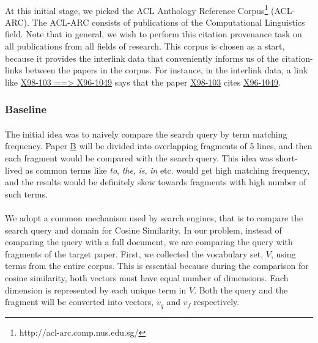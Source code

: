\documentclass[12 pt]{article}
\begin{document}
\paragraph{}
At this initial stage, we picked the ACL Anthology Reference Corpus\footnote{http://acl-arc.comp.nus.edu.sg/} (ACL-ARC). The ACL-ARC consists of publications of the Computational Linguistics field. Note that in general, we wish to perform this citation provenance task on all publications from all fields of research. This corpus is chosen as a start, because it provides the interlink data that conveniently informs us of the citation-links between the papers in the corpus. For instance, in the interlink data, a link like \url{X98-103 ==> X96-1049} says that the paper \url{X98-103} cites \url{X96-1049}.

\subsubsection{Baseline}
\paragraph{}
The initial idea was to naively compare the search query by term matching frequency. Paper \url{B} will be divided into overlapping fragments of 5 lines, and then each fragment would be compared with the search query. This idea was short-lived as common terms like \textit{to}, \textit{the}, \textit{is}, \textit{in} etc. would get high matching frequency, and the results would be definitely skew towards fragments with high number of such terms.

\paragraph{}
We adopt a common mechanism used by search engines, that is to compare the search query and domain for Cosine Similarity\cite{irtextbook}. In our problem, instead of comparing the query with a full document, we are comparing the query with fragments of the target paper. First, we collected the vocabulary set, $V$, using terms from the entire corpus. This is essential because during the comparison for cosine similarity, both vectors must have equal number of dimensions. Each dimension is represented by each unique term in $V$. Both the query and the fragment will be converted into vectors, $v_q$ and $v_f$ respectively.
\end{document}
